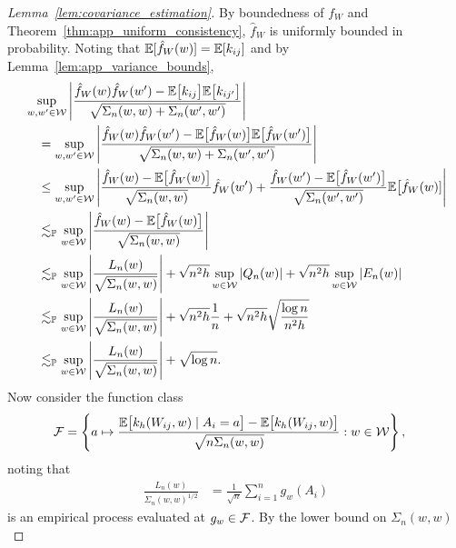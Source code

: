 \begin{proof}[Lemma~\ref{lem:covariance_estimation}]
  By boundedness of $f_W$ and
  Theorem~\ref{thm:app_uniform_consistency},
  $\hat f_W$ is uniformly bounded in probability.
  Noting that
  $\mathbb{E}[\hat f_W(w)] = \mathbb{E}[k_{i j}]$
  and by Lemma~\ref{lem:app_variance_bounds},
  \begin{align*}
    &\sup_{w,w' \in \mathcal{W}}
    \left|
    \frac{
      \hat f_W(w) \hat f_W(w')
    - \mathbb{E}\big[k_{i j}\big] \mathbb{E}\big[k_{i j'}\big]}
    {\sqrt{\Sigma_n(w,w) + \Sigma_n(w',w')}}
    \right| \\
    &\quad=
    \sup_{w,w' \in \mathcal{W}}
    \left|
    \frac{
      \hat f_W(w) \hat f_W(w')
    - \mathbb{E}\big[\hat f_W(w)\big] \mathbb{E}\big[\hat f_W(w')\big]}
    {\sqrt{\Sigma_n(w,w) + \Sigma_n(w',w')}}
    \right| \\
    &\quad\leq
    \sup_{w,w' \in \mathcal{W}}
    \left|
    \frac{\hat f_W(w) - \mathbb{E}\big[\hat f_W(w)\big]}
    {\sqrt{\Sigma_n(w,w)}}
    \hat f_W(w')
    + \frac{\hat f_W(w') - \mathbb{E}\big[\hat f_W(w')\big]}
    {\sqrt{\Sigma_n(w',w')}}
    \mathbb{E}\big[\hat f_W(w)]
    \right| \\
    &\quad\lesssim_{\mathbb{P}}
    \sup_{w \in \mathcal{W}}
    \left|
    \frac{\hat f_W(w) - \mathbb{E}\big[\hat f_W(w)\big]}
    {\sqrt{\Sigma_n(w,w)}}
    \right| \\
    &\quad\lesssim_{\mathbb{P}}
    \sup_{w \in \mathcal{W}}
    \left|
    \frac{L_n(w)}
    {\sqrt{\Sigma_n(w,w)}}
    \right|
    + \sqrt{n^2h} \sup_{w \in \mathcal{W}} \left| Q_n(w) \right|
    + \sqrt{n^2h} \sup_{w \in \mathcal{W}} \left| E_n(w) \right| \\
    &\quad\lesssim_{\mathbb{P}}
    \sup_{w \in \mathcal{W}}
    \left|
    \frac{L_n(w)}
    {\sqrt{\Sigma_n(w,w)}}
    \right|
    + \sqrt{n^2h} \frac{1}{n}
    + \sqrt{n^2h} \sqrt{\frac{\log n}{n^2h}} \\
    &\quad\lesssim_{\mathbb{P}}
    \sup_{w \in \mathcal{W}}
    \left|
    \frac{L_n(w)}
    {\sqrt{\Sigma_n(w,w)}}
    \right|
    + \sqrt{\log n}.
  \end{align*}
  Now consider the function class
  \begin{align*}
    \mathcal{F}
    &=
    \left\{
      a \mapsto
      \frac{
        \mathbb{E}\big[k_h(W_{i j},w) \mid A_i = a \big]
      - \mathbb{E}\big[k_h(W_{i j},w) \big]}
      {\sqrt{n \Sigma_n(w,w)}}:
      w \in \mathcal{W}
    \right\},
  \end{align*}
  noting that
  \begin{align*}
    \frac{L_n(w)}
    {\Sigma_n(w,w)^{1/2}}
    &=
    \frac{1}{\sqrt n}
    \sum_{i=1}^n
    g_w(A_i)
  \end{align*}
  is an empirical process evaluated at
  $g_w \in \mathcal{F}$.
  By the lower bound on $\Sigma_n(w,w)$

\end{proof}
